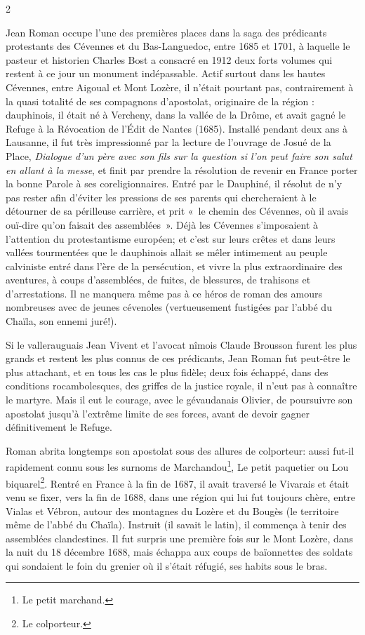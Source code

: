 {\fontsize{9.65}{11.05}\selectfont
\begin{multicols}{2}

Jean Roman occupe l’une des premières places dans la saga des prédicants protestants des Cévennes et du Bas-Languedoc, entre 1685 et 1701, à laquelle le pasteur et historien Charles Bost a consacré en 1912 deux forts volumes qui restent à ce jour un monument indépassable. Actif surtout dans les hautes Cévennes, entre Aigoual et Mont Lozère, il n’était pourtant pas, contrairement à la quasi totalité de ses compagnons d’apostolat, originaire de la région : dauphinois, il était né à Vercheny, dans la vallée de la Drôme, et avait gagné le Refuge à la Révocation de l’Édit de Nantes (1685). Installé pendant deux ans à Lausanne, il fut très impressionné par la lecture de l’ouvrage de Josué de la Place, \textit{Dialogue d’un père avec son fils sur la question si l’on peut faire son salut en allant à la messe}, et finit par prendre la résolution de revenir en France porter la bonne Parole à ses coreligionnaires. Entré par le Dauphiné, il résolut de n’y pas rester afin d’éviter les pressions de ses parents qui chercheraient à le détourner de sa périlleuse carrière, et prit «~le chemin des Cévennes, où il avais ouï-dire qu’on faisait des assemblées~». Déjà les Cévennes s’imposaient à l’attention du protestantisme européen; et c’est sur leurs crêtes et dans leurs vallées tourmentées que le dauphinois allait se mêler intimement au peuple calviniste entré dans l’ère de la persécution, et vivre la plus extraordinaire des aventures, à coups d’assemblées, de fuites, de blessures, de trahisons et d’arrestations. Il ne manquera même pas à ce héros de roman des amours nombreuses avec de jeunes cévenoles (vertueusement fustigées par l’abbé du Chaïla, son ennemi juré!).

Si le vallerauguais Jean Vivent et l’avocat nîmois Claude Brousson furent les plus grands et restent les plus connus de ces prédicants, Jean Roman fut peut-être le plus attachant, et en tous les cas le plus fidèle; deux fois échappé, dans des conditions rocambolesques, des griffes de la justice royale, il n’eut pas à connaître le martyre. Mais il eut le courage, avec le gévaudanais Olivier, de poursuivre son apostolat jusqu’à l’extrême limite de ses forces, avant de devoir gagner définitivement le Refuge.

Roman abrita longtemps son apostolat sous des allures de colporteur: aussi fut-il rapidement connu sous les surnoms de Marchandou\footnote{Le petit marchand.}, Le petit paquetier ou Lou biquarel\footnote{Le colporteur.}. Rentré en France à la fin de 1687, il avait traversé le Vivarais et était venu se fixer, vers la fin de 1688, dans une région qui lui fut toujours chère, entre Vialas et Vébron, autour des montagnes du Lozère et du Bougès (le territoire même de l’abbé du Chaïla). Instruit (il savait le latin), il commença à tenir des assemblées clandestines. Il fut surpris une première fois sur le Mont Lozère, dans la nuit du 18 décembre 1688, mais échappa aux coups de baïonnettes des soldats qui sondaient le foin du grenier où il s’était réfugié, ses habits sous le bras.


\end{multicols}}
